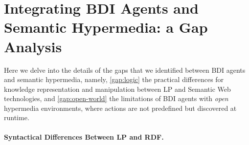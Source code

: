 \documentclass[
]{ceurart}
\begin{document}
\section{Integrating \acs{BDI} Agents and Semantic Hypermedia: a Gap Analysis}
\label{sec:gap-analysis}


Here we delve into the details of the gaps that we identified between \ac{BDI} agents and semantic hypermedia,
namely,
\ref{gap:logic} the practical differences for knowledge representation and manipulation
between \ac{LP} and Semantic Web technologies,
and
\ref{gap:open-world} the limitations of \ac{BDI} agents with \emph{open} hypermedia environments,
where actions are not predefined but discovered at runtime.

\paragraph{Syntactical Differences Between \acs{LP} and \acs{RDF}.}
\end{document}
